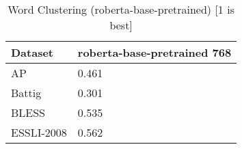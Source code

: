 \begin{table}[]
\centering
\begin{tabular}{l|l}
\hline
Dataset & roberta-base-pretrained 768 \\
\hline
AP & 0.461 \\ 
Battig & 0.301 \\ 
BLESS & 0.535 \\ 
ESSLI-2008 & 0.562
\end{tabular}
\caption{Word Clustering (roberta-base-pretrained) [1 is best]}
\label{tab:cluster-roberta-base-pretrained}
\end{table}
